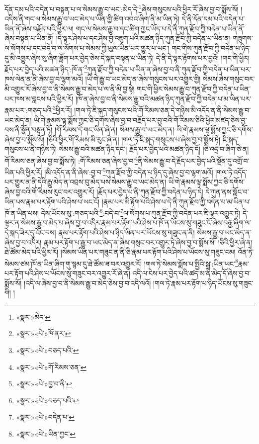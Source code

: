 དོན་དམ་པའི་བདེན་པ་བསྟན་པ་ལ་སེམས་རྒྱུ་བ་ཡང་:མེད་དེ་\footnote{«སྣར་»མེད་}ཞེས་གསུངས་པའི་ཕྱིར་རོ་ཞེས་བྱ་བ་སྨོས་སོ། །འདིས་ནི་གང་ལ་སེམས་རྒྱུ་བ་ཡང་མེད་པ་ཡིན་གྱི་ཚིག་འབའ་ཞིག་ནི་མ་ཡིན་ཏེ། དེ་ནི་དོན་དམ་པའི་བདེན་པ་ཡིན་ནོ་ཞེས་བརྗོད་པའི་ཕྱིར་ལ། གང་ལ་སེམས་རྒྱུ་བ་དང་ཚིག་ཀྱང་ཡོད་པ་དེ་ནི་ཀུན་རྫོབ་ཀྱི་བདེན་པ་ཡིན་ནོ་ཞེས་བསྟན་པ་ཡིན་ནོ། །དེ་ལྟར་ཤེས་པ་དང་ཤེས་བྱ་འཇུག་པའི་མཚན་ཉིད་ཀུན་རྫོབ་ཀྱི་བདེན་པ་ཡིན་ན། གཟུགས་ལ་སོགས་པ་དང་བདེ་བ་ལ་སོགས་པ་སེམས་ཀྱི་ཡུལ་ཡིན་པར་གྱུར་པ་ཡང་། གང་གིས་ཀུན་རྫོབ་ཀྱི་བདེན་པ་ཉིད་དུ་མི་འགྱུར་ཞེས་སུ་ཞིག་ཟློག་པར་བྱེད་ཅེས་དེ་སྐད་བསྟན་པ་ཡིན་ཏེ། དེ་ནི་དེ་ལྟར་རྟོགས་པར་བྱའོ། །གང་གི་ཕྱིར། རྗོད་པར་བྱེད་པའི་མཚན་ཉིད་:ཁོ་ན་\footnote{«སྣར་»«པེ་»ཁོ་ནར་}ཀུན་རྫོབ་ཀྱི་བདེན་པ་ཡིན་ན་ཞེས་བྱ་བ་ནི་ཀུན་རྫོབ་ཀྱི་བདེན་པ་ཡིན་པར་ཁས་ལེན་ན་ནི་ཞེས་བྱ་བ་ལྷག་མའོ། །ཡི་གེ་རྒྱུ་བ་ཡང་མེད་ན་ཞེས་གསུངས་པར་འགྱུར་གྱི། སེམས་ཞེས་གསུང་བར་མི་འགྱུར་རོ་ཞེས་བྱ་བ་ནི་སེམས་རྒྱུ་བ་མེད་པ་ལ་ནི་མི་བྱ་སྟེ། གང་གི་ཕྱིར་སེམས་རྒྱུ་བ་ཀུན་རྫོབ་ཀྱི་བདེན་པ་ཡིན་པར་ཁས་མ་བླངས་པའི་ཕྱིར་རོ། །ཁོ་ན་ཞེས་བྱ་བ་ནི་སེམས་རྒྱུ་བའི་མཚན་ཉིད་ཀུན་རྫོབ་ཀྱི་བདེན་པ་མ་ཡིན་པར་རྣམ་པར་:གཅད་པའི་\footnote{«སྣར་»«པེ་»བཅད་པའི་}ཕྱིར་རོ། །གལ་ཏེ་ཇི་སྐད་གསུངས་པའི་གོ་རིམས་ཅན་དེ་གཉིས་མི་འདོད་ན་ནི་སེམས་རྒྱུ་བ་ཡང་མེད་ན། ཡི་གེ་རྣམས་ལྟ་སྨོས་ཀྱང་ཅི་དགོས་ཞེས་བྱ་བ་བརྗོད་པར་བྱ་བའི་གོ་རིམས་ཅིའི་ཕྱིར་མཛད་ཅེས་བྱ་བས་ནི་སྣོན་བསྟན་ཏོ། །གོ་རིམས་དེ་གང་ཡིན་ཞེ་ན། སེམས་རྒྱུ་བ་ཡང་མེད་ན། ཡི་གེ་རྣམས་ལྟ་སྨོས་ཀྱང་ཅི་དགོས་ཞེས་བྱ་བ་སྨོས་སོ། །ཅིའི་ཕྱིར་གོ་རིམས་མི་རུང་ཞེ་ན། །གལ་ཏེ་ཇི་སྐད་གསུངས་པ་ཞེས་བྱ་བ་སྨོས་ཏེ། ཇི་སྐད་གསུངས་པ་ནི་གཉིས་ཏེ། སེམས་རྒྱུ་བའི་མཚན་ཉིད་དང་། རྗོད་པར་བྱེད་པའི་མཚན་ཉིད་དོ། །ཅི་འདྲ་བ་ཞིག་ཅེ་ན། གོ་རིམས་ཅན་ཞེས་བྱ་བ་སྨོས་ཏེ། :གོ་རིམས་ཅན་ཞེས་བྱ་བ་\footnote{«སྣར་»«པེ་»གོ་རིམས་ཅན་}ནི་སེམས་རྒྱུ་བ་དེ་རྗོད་པར་བྱེད་པའི་སྔོན་དུ་འགྲོ་བ་ཡིན་པའི་ཕྱིར་རོ། །མི་འདོད་ན་ནི་ཞེས་:བྱ་བ་\footnote{«སྣར་»«པེ་»བྱ་བ་ནི་}ཀུན་རྫོབ་ཀྱི་བདེན་པ་ཉིད་དུ་ཞེས་བྱ་བ་ལྷག་མའོ། །གལ་ཏེ་འདོད་པར་གྱུར་ན་ནི་དེའི་རྒྱུ་མེད་ན་འབྲས་བུ་མེད་པས་སེམས་རྒྱུ་བ་ཡང་མེད་ན། ཡི་གེ་རྣམས་ལྟ་སྨོས་ཀྱང་ཅི་དགོས་ཞེས་བྱ་བའི་གོ་རིམས་རུང་བར་འགྱུར་རོ། །རྗོད་པར་བྱེད་པ་ནི་ཀུན་རྫོབ་ཀྱི་བདེན་པ་ཉིད་དེ། དེ་ཀུན་ནས་སློང་བ་ཡིན་པས་རྣམ་པར་རྟོག་པའི་ཤེས་པ་ཡང་ངོ། །རྣམ་པར་མི་རྟོག་པའི་ཤེས་པ་དེ་ནི་ཀུན་རྫོབ་ཀྱི་བདེན་པ་མ་ཡིན་པ་ཁོ་ན་ཡིན་པས། དེས་ཡོངས་སུ་:གཅད་པའི་\footnote{«སྣར་»«པེ་»བཅད་པའི་}:བདེ་བ་\footnote{«སྣར་»«པེ་»བདེན་པ་}ལ་སོགས་པ་ཀུན་རྫོབ་ཀྱི་བདེན་པར་ཇི་ལྟར་འགྱུར་ཏེ། དེ་ལྟར་ན་སེམས་རྒྱུ་བ་མེད་པ་ཞེས་བྱ་བ་འདིར་རྣམ་པར་རྟོག་པའི་ཤེས་པ་ཁོ་ན་ཡོངས་སུ་གཟུང་ངོ་ཞེས་བརྒྱ་ཞིག་ལ་དེ་སྐད་ཟེར་དུ་འོང་བས། རྣམ་པར་རྟོག་པའི་ཤེས་པ་ཉིད་ཡིན་པར་ཡོངས་སུ་གཟུང་ན་ནི། སེམས་རྒྱུ་བ་ཡང་མེད་ན་ཞེས་བྱ་བ་འདིར། རྣམ་པར་རྟོག་པ་རྒྱུ་བ་ཡང་མེད་ན་ཞེས་གསུང་བར་འགྱུར་ཏེ་ཞེས་བྱ་བ་སྨོས་སོ། །ཅིའི་ཕྱིར་ཞེ་ན། ཐེ་ཚོམ་མེད་པའི་ཕྱིར་རོ། །སེམས་ཡིན་པར་གཟུང་ན་ནི་ཅི་རྣམ་པར་རྟོག་པའི་ཤེས་པ་ཡོངས་སུ་གཟུང་ངམ། འོན་ཏེ་སེམས་ཙམ་ཁོ་ན་ཡིན་ཞིག་གུ་སྙམ་དུ་ཐེ་ཚོམ་ཟ་བར་འགྱུར་རོ། །གལ་ཏེ་སེམས་སྨོས་པ་སྤྱིའི་སྒྲ་:ཡིན་ཡང་\footnote{«སྣར་»«པེ་»ཡིན་ཀྱང་}རྣམ་པར་རྟོག་པའི་ཤེས་པ་ཡོངས་སུ་གཟུང་བར་འགྱུར་རོ་ཞེ་ན། འདི་ལ་ངེས་པར་བྱེད་པའི་ཚད་མ་ནི་མེད་དོ་ཞེས་བྱ་བ་སྨོས་སོ། །འདི་ལ་ཞེས་བྱ་བ་ནི་སེམས་རྒྱུ་བ་མེད་ཅེས་བྱ་བ་འདི་ལའོ། །གལ་ཏེ་རྣམ་པར་རྟོག་པ་ཉིད་ཡོངས་སུ་གཟུང་གི། །
